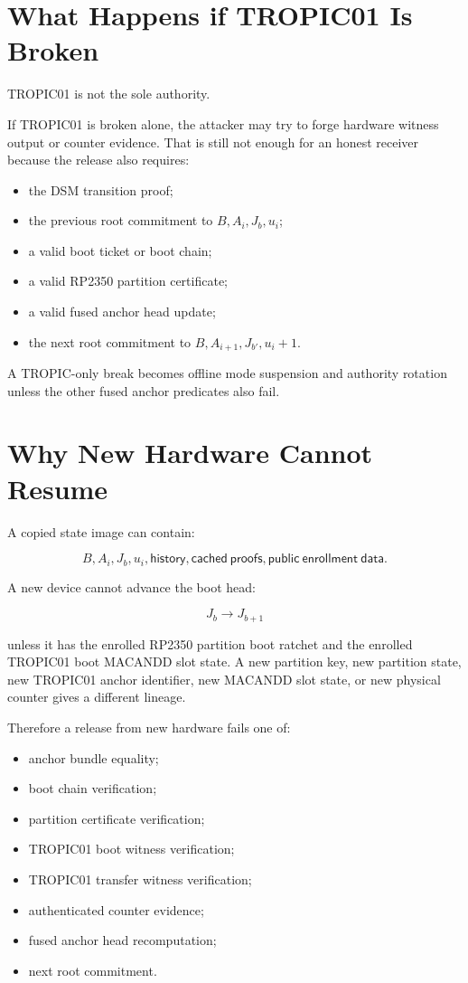 \documentclass[11pt]{article}
\theoremstyle{definition}
\theoremstyle{remark}
\newcommand{\Bundle}{\ensuremath{B}}
\newcommand{\Ahead}{\ensuremath{A}}
\newcommand{\Bhead}{\ensuremath{J}}
\begin{document}
\section{What Happens if TROPIC01 Is Broken}

TROPIC01 is not the sole authority.

If TROPIC01 is broken alone, the attacker may try to forge hardware witness output or counter
evidence. That is still not enough for an honest receiver because the release also requires:

\begin{itemize}
\item the DSM transition proof;
\item the previous root commitment to \(\Bundle,\Ahead_i,\Bhead_b,u_i\);
\item a valid boot ticket or boot chain;
\item a valid RP2350 partition certificate;
\item a valid fused anchor head update;
\item the next root commitment to \(\Bundle,\Ahead_{i+1},\Bhead_{b'},u_i+1\).
\end{itemize}

A TROPIC-only break becomes offline mode suspension and authority rotation unless the other fused
anchor predicates also fail.

\section{Why New Hardware Cannot Resume}

A copied state image can contain:

\[
\Bundle,\Ahead_i,\Bhead_b,u_i,
\mathsf{history},
\mathsf{cached\ proofs},
\mathsf{public\ enrollment\ data}.
\]

A new device cannot advance the boot head:

\[
\Bhead_b\rightarrow\Bhead_{b+1}
\]

unless it has the enrolled RP2350 partition boot ratchet and the enrolled TROPIC01 boot MACANDD
slot state. A new partition key, new partition state, new TROPIC01 anchor identifier, new MACANDD
slot state, or new physical counter gives a different lineage.

Therefore a release from new hardware fails one of:

\begin{itemize}
\item anchor bundle equality;
\item boot chain verification;
\item partition certificate verification;
\item TROPIC01 boot witness verification;
\item TROPIC01 transfer witness verification;
\item authenticated counter evidence;
\item fused anchor head recomputation;
\item next root commitment.
\end{itemize}
\end{document}
